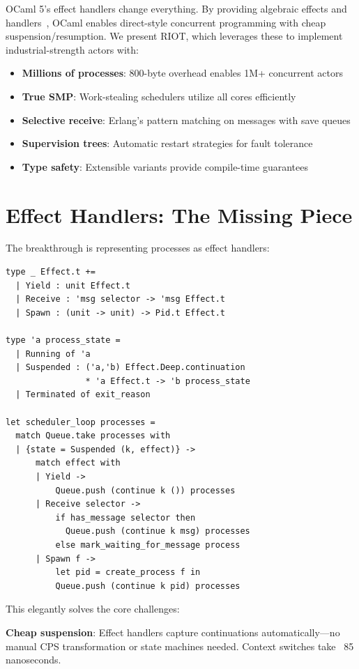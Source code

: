 \documentclass[sigplan,10pt]{acmart}
\begin{document}
OCaml 5's effect handlers change everything. By providing algebraic effects and handlers~\cite{ocaml5effects}, OCaml enables direct-style concurrent programming with cheap suspension/resumption. We present RIOT, which leverages these to implement industrial-strength actors with:
\begin{itemize}
\itemsep0em
\item \textbf{Millions of processes}: 800-byte overhead enables 1M+ concurrent actors
\item \textbf{True SMP}: Work-stealing schedulers utilize all cores efficiently  
\item \textbf{Selective receive}: Erlang's pattern matching on messages with save queues
\item \textbf{Supervision trees}: Automatic restart strategies for fault tolerance
\item \textbf{Type safety}: Extensible variants provide compile-time guarantees
\end{itemize}

\vspace{-0.2cm}
\section{Effect Handlers: The Missing Piece}

The breakthrough is representing processes as effect handlers:

\begin{lstlisting}
type _ Effect.t += 
  | Yield : unit Effect.t
  | Receive : 'msg selector -> 'msg Effect.t
  | Spawn : (unit -> unit) -> Pid.t Effect.t

type 'a process_state =
  | Running of 'a
  | Suspended : ('a,'b) Effect.Deep.continuation 
                * 'a Effect.t -> 'b process_state
  | Terminated of exit_reason

let scheduler_loop processes =
  match Queue.take processes with
  | {state = Suspended (k, effect)} ->
      match effect with
      | Yield -> 
          Queue.push (continue k ()) processes
      | Receive selector ->
          if has_message selector then
            Queue.push (continue k msg) processes
          else mark_waiting_for_message process
      | Spawn f ->
          let pid = create_process f in
          Queue.push (continue k pid) processes
\end{lstlisting}

This elegantly solves the core challenges:

\textbf{Cheap suspension}: Effect handlers capture continuations automatically—no manual CPS transformation or state machines needed. Context switches take ~85 nanoseconds.
\end{document}
